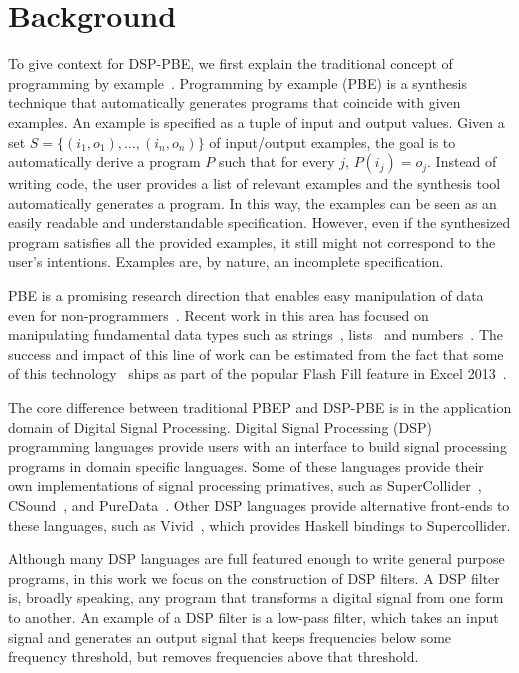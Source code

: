 \section{Background}

To give context for DSP-PBE, we first explain the traditional concept of programming by example~\cite{cypher93,lieberman01,synasc12}.
Programming by example (PBE) is a synthesis technique that automatically generates programs that coincide with given examples. An example is specified as a tuple of input and output values. Given a set $S= \{(i_1, o_1),\ldots, (i_n, o_n)\}$ of input/output examples, the goal is to automatically derive a program $P$ such that for every $j$, $P(i_j) = o_j$. 
Instead of writing code, the user provides a list of relevant examples and the synthesis tool automatically generates a program. In this way, the examples can be seen as an easily readable and understandable specification. However, even if the synthesized program satisfies all the provided examples, it still might not correspond to the user's intentions. Examples are, by nature, an incomplete specification.

PBE is a promising research direction that enables easy manipulation of data even for non-programmers~\cite{GulwaniHS12}. Recent work in this area has focused on manipulating fundamental data types such as strings~\cite{vldb12,icml13}, lists~\cite{FeserCD15,poseraZ15} and numbers~\cite{cav12}. The success and impact of this line of work can be estimated from the fact that some of this technology~\cite{flashFillPOPL} ships as part of the popular Flash Fill feature in Excel 2013~\cite{flashfill}.


The core difference between traditional PBEP and DSP-PBE is in the application domain of Digital Signal Processing.
Digital Signal Processing (DSP) programming languages provide users with an interface to build signal processing programs in domain specific languages.
Some of these languages provide their own implementations of signal processing primatives, such as SuperCollider~\cite{supercollider}, CSound~\cite{csound}, and PureData~\cite{puredata}.
Other DSP languages provide alternative front-ends to these languages, such as Vivid~\cite{vivid}, which provides Haskell bindings to Supercollider.

Although many DSP languages are full featured enough to write general purpose programs, in this work we focus on the construction of DSP filters.
A DSP filter is, broadly speaking, any program that transforms a digital signal from one form to another.
An example of a DSP filter is a low-pass filter, which takes an input signal and generates an output signal that keeps frequencies below some frequency threshold, but removes frequencies above that threshold.

